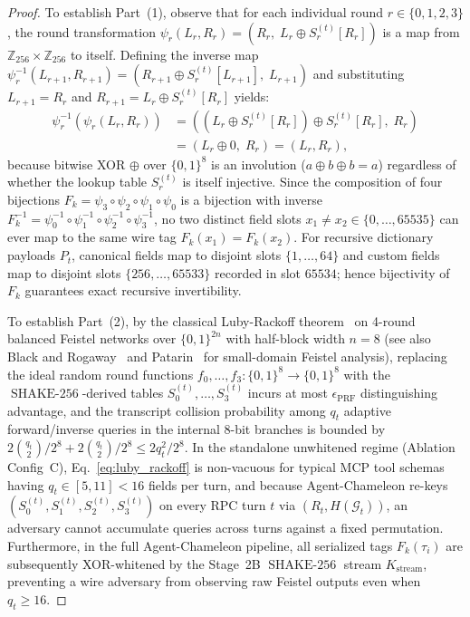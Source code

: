 \documentclass[conference,10pt]{IEEEtran}
\begin{document}
\begin{proof}
To establish Part~(1), observe that for each individual round $r \in \{0,1,2,3\}$, the round transformation $\psi_r(L_r, R_r) = (R_r,\; L_r \oplus S_r^{(t)}[R_r])$ is a map from $\mathbb{Z}_{256} \times \mathbb{Z}_{256}$ to itself. Defining the inverse map $\psi_r^{-1}(L_{r+1}, R_{r+1}) = (R_{r+1} \oplus S_r^{(t)}[L_{r+1}],\; L_{r+1})$ and substituting $L_{r+1} = R_r$ and $R_{r+1} = L_r \oplus S_r^{(t)}[R_r]$ yields:
\begin{equation}
\begin{aligned}
\psi_r^{-1}(\psi_r(L_r, R_r)) &= \left((L_r \oplus S_r^{(t)}[R_r]) \oplus S_r^{(t)}[R_r],\; R_r\right) \\
&= \left(L_r \oplus 0,\; R_r\right) = (L_r, R_r),
\end{aligned}
\end{equation}
because bitwise XOR $\oplus$ over $\{0,1\}^8$ is an involution ($a \oplus b \oplus b = a$) regardless of whether the lookup table $S_r^{(t)}$ is itself injective. Since the composition of four bijections $F_k = \psi_3 \circ \psi_2 \circ \psi_1 \circ \psi_0$ is a bijection with inverse $F_k^{-1} = \psi_0^{-1} \circ \psi_1^{-1} \circ \psi_2^{-1} \circ \psi_3^{-1}$, no two distinct field slots $x_1 \ne x_2 \in \{0,\dots,65535\}$ can ever map to the same wire tag $F_k(x_1) = F_k(x_2)$. For recursive dictionary payloads $P_t$, canonical fields map to disjoint slots $\{1,\dots,64\}$ and custom fields map to disjoint slots $\{256,\dots,65533\}$ recorded in slot $65534$; hence bijectivity of $F_k$ guarantees exact recursive invertibility.

To establish Part~(2), by the classical Luby-Rackoff theorem~\cite{luby1988construct} on 4-round balanced Feistel networks over $\{0,1\}^{2n}$ with half-block width $n = 8$ (see also Black and Rogaway~\cite{black2002ciphers} and Patarin~\cite{patarin2004luby} for small-domain Feistel analysis), replacing the ideal random round functions $f_0, \dots, f_3: \{0,1\}^8 \to \{0,1\}^8$ with the $\operatorname{SHAKE-256}$-derived tables $S_0^{(t)}, \dots, S_3^{(t)}$ incurs at most $\epsilon_{\text{PRF}}$ distinguishing advantage, and the transcript collision probability among $q_t$ adaptive forward/inverse queries in the internal 8-bit branches is bounded by $2 \binom{q_t}{2} / 2^8 + 2 \binom{q_t}{2} / 2^8 \le 2 q_t^2 / 2^8$. In the standalone unwhitened regime (Ablation Config~C), Eq.~\eqref{eq:luby_rackoff} is non-vacuous for typical MCP tool schemas having $q_t \in [5, 11] < 16$ fields per turn, and because Agent-Chameleon re-keys $(S_0^{(t)}, S_1^{(t)}, S_2^{(t)}, S_3^{(t)})$ on every RPC turn $t$ via $(R_t, H(\mathcal{G}_t))$, an adversary cannot accumulate queries across turns against a fixed permutation. Furthermore, in the full Agent-Chameleon pipeline, all serialized tags $F_k(\tau_i)$ are subsequently XOR-whitened by the Stage~2B $\operatorname{SHAKE-256}$ stream $K_{\text{stream}}$, preventing a wire adversary from observing raw Feistel outputs even when $q_t \ge 16$.
\end{proof}
\end{document}
